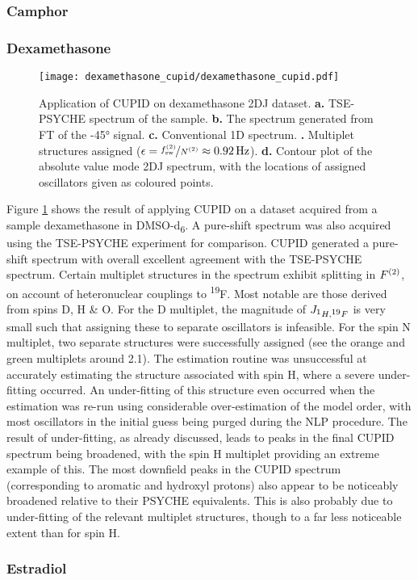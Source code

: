 \subsubsection{Camphor}

\subsubsection{Dexamethasone}

\begin{sidewaysfigure}%
    \centering%
    \texttt{[image: dexamethasone\_cupid/dexamethasone\_cupid.pdf]}%
    \caption[
        Application of \acs{CUPID} on a dexamethasone dataset.
    ]{
        Application of \acs{CUPID} on dexamethasone \ac{2DJ} dataset.
        \textbf{a.} \acs{TSE-PSYCHE} spectrum of the sample.
        \textbf{b.} The spectrum generated from \ac{FT} of the \ang{-45}
        signal.
        \textbf{c.} Conventional \acs{1D} spectrum.
        \textbf{.} Multiplet structures assigned ($\epsilon =
        \nicefrac{f_{\mathrm{sw}}^{(2)}}{N^{(2)}} \approx \qty{0.92}{\hertz}$).
        \textbf{d.} Contour plot of the absolute value mode \acs{2DJ} spectrum,
        with the locations of assigned oscillators given as coloured points.
    }
    \label{fig:dexamethasone-cupid}%
\end{sidewaysfigure}%

Figure \ref{fig:dexamethasone-cupid} shows the result of applying CUPID on a
dataset acquired from a sample dexamethasone in DMSO-d\textsubscript{6}. A
pure-shift spectrum was also acquired using the
\ac{TSE-PSYCHE} experiment\cite{Foroozandeh2018,Foroozandeh2015} for
comparison.
\ac{CUPID} generated a pure-shift spectrum with overall excellent agreement
with the \ac{TSE-PSYCHE} spectrum. Certain multiplet structures in the spectrum exhibit
splitting in $F^{(2)}$, on account of heteronuclear couplings to \textsuperscript{19}F. Most
notable are those derived from spins D, H \& O. For the D multiplet, the
magnitude of $J_{\textsuperscript{1}H,\textsuperscript{19}F}$ is very small
such that assigning these to separate oscillators is infeasible.
For the spin N multiplet, two separate structures were successfully assigned
(see the orange and green multiplets around \qty{2.1}{\partspermillion}).
The estimation routine was unsuccessful at accurately estimating the structure
associated with spin H, where a severe under-fitting occurred. An under-fitting
of this structure even occurred when the estimation was re-run using
considerable over-estimation of the model order, with most oscillators in the
initial guess being purged during the \ac{NLP} procedure. The result of
under-fitting, as already discussed, leads to peaks in the final \ac{CUPID}
spectrum being broadened, with the spin H multiplet providing an extreme
example of this. The most downfield peaks in the CUPID spectrum (corresponding
to aromatic and hydroxyl protons) also appear to be noticeably broadened
relative to their PSYCHE equivalents. This is also probably due to
under-fitting of the relevant multiplet structures, though to a far less
noticeable extent than for spin H. 

\subsubsection{Estradiol}
